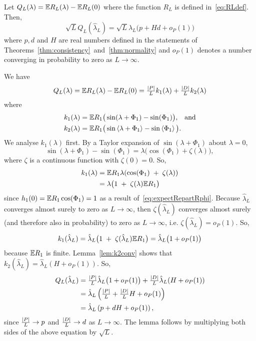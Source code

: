 \documentclass[journal]{IEEEtran}
\begin{document}
\begin{lemma}\label{lem:Qconv}
Let $Q_L(\lambda) = {\mathbb E} R_L(\lambda) - {\mathbb E} R_L(0)$ where the function $R_L$ is defined in~\eqref{eq:RLdef}.  Then,
\[ 
\sqrt{L} Q_L(\hat{\lambda}_L) = \sqrt{L} \hat{\lambda}_L\big( p + Hd  + o_P(1) \big)
\]
where $p, d$ and $H$ are real numbers defined in the statements of Theorems~\ref{thm:consistency}~and~\ref{thm:normality} and $o_P(1)$ denotes a number converging in probability to zero as $L\rightarrow\infty$.
\end{lemma}
\begin{IEEEproof}
We have
\[
Q_L(\lambda) = {\mathbb E} R_L(\lambda) - {\mathbb E} R_L(0) = \tfrac{{\vert P \vert}}{L} k_1(\lambda) + \tfrac{{\vert D \vert}}{L} k_2(\lambda)
\]
where
\begin{align}
k_1(\lambda) &= {\mathbb E} R_1\big( \sin(\lambda + \Phi_1) - \sin(\Phi_1) \big), \;\;\; \text{and} \nonumber\\
k_2(\lambda) &= {\mathbb E} R_1\big( \sin\left\langle \lambda + \Phi_1 \right\rangle - \sin\left\langle \Phi_1 \right\rangle \big). \label{eq:k2def}
\end{align}
We analyse $k_1(\lambda)$ first.  By a Taylor expansion of $\sin(\lambda + \Phi_1)$ about $\lambda = 0$,
\[
\sin(\lambda + \Phi_1) - \sin(\Phi_1) = \lambda \big( \cos(\Phi_1) + \zeta(\lambda) \big),
\]
where $\zeta$ is a continuous function with $\zeta(0) = 0$.  So,
\begin{align*}
k_1(\lambda) &= {\mathbb E} R_1\lambda(\cos(\Phi_1) \; + \; \zeta(\lambda)) \\
&= \lambda \big( 1 \; + \; \zeta(\lambda) {\mathbb E} R_1 \big) 
\end{align*}
since $h_1(0) = {\mathbb E} R_1\cos(\Phi_1) = 1$ as a result of~\eqref{eq:expectRepartRphi}.  Because $\hat{\lambda}_L$ converges almost surely to zero as $L \rightarrow\infty$, then $\zeta(\hat{\lambda}_L)$ converges almost surely (and therefore also in probability) to zero as $L \rightarrow\infty$, i.e. $\zeta(\hat{\lambda}_L) = o_P(1)$.  So, 
\[
k_1(\hat{\lambda}_L) = \hat{\lambda}_L \big( 1 \; + \; \zeta(\hat{\lambda}_L) {\mathbb E} R_1 \big) = \hat{\lambda}_L \big( 1  + o_P(1)\big)
\]
because ${\mathbb E} R_1$ is finite.  Lemma~\ref{lem:k2conv} shows that $k_2(\hat{\lambda}_L) = \hat{\lambda}_L ( H + o_P(1) )$.  So,
\begin{align*}
Q_L(\hat{\lambda}_L) &=  \tfrac{{\vert P \vert}}{L} \hat{\lambda}_L \big( 1  + o_P(1)\big)  + \tfrac{{\vert D \vert}}{L} \hat{\lambda}_L ( H + o_P(1) ) \\
&= \hat{\lambda}_L \left( \tfrac{{\vert P \vert}}{L}  + \tfrac{{\vert D \vert}}{L} H + o_P(1) \right) \\
&= \hat{\lambda}_L \left( p  + d H + o_P(1) \right),
\end{align*}
since $\frac{{\vert P \vert}}{L} \rightarrow p$ and $\frac{{\vert D \vert}}{L} \rightarrow d$ as $L \rightarrow \infty$.  The lemma follows by multiplying both sides of the above equation by $\sqrt{L}$.
\end{IEEEproof}
\end{document}
